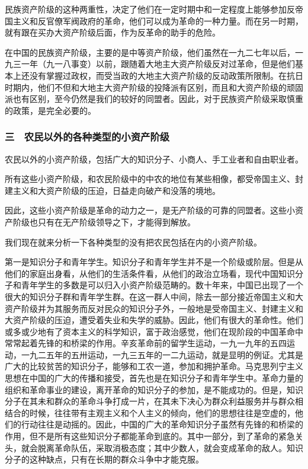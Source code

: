 民族资产阶级的这种两重性，决定了他们在一定时期中和一定程度上能够参加反帝国主义和反官僚军阀政府的革命，他们可以成为革命的一种力量。而在另一时期，就有跟在买办大资产阶级后面，作为反革命的助手的危险。

在中国的民族资产阶级，主要的是中等资产阶级，他们虽然在一九二七年以后，一九三一年（九一八事变）以前，跟随着大地主大资产阶级反对过革命，但是他们基本上还没有掌握过政权，而受当政的大地主大资产阶级的反动政策所限制。在抗日时期内，他们不但和大地主大资产阶级的投降派有区别，而且和大资产阶级的顽固派也有区别，至今仍然是我们的较好的同盟者。因此，对于民族资产阶级采取慎重的政策，是完全必要的。

\subsubsection{三　农民以外的各种类型的小资产阶级}

农民以外的小资产阶级，包括广大的知识分子、小商人、手工业者和自由职业者。

所有这些小资产阶级，和农民阶级中的中农的地位有某些相像，都受帝国主义、封建主义和大资产阶级的压迫，日益走向破产和没落的境地。

因此，这些小资产阶级是革命的动力之一，是无产阶级的可靠的同盟者。这些小资产阶级也只有在无产阶级领导之下，才能得到解放。

我们现在就来分析一下各种类型的没有把农民包括在内的小资产阶级。

第一是知识分子和青年学生。知识分子和青年学生并不是一个阶级或阶层。但是从他们的家庭出身看，从他们的生活条件看，从他们的政治立场看，现代中国知识分子和青年学生的多数是可以归入小资产阶级范畴的。数十年来，中国已出现了一个很大的知识分子群和青年学生群。在这一群人中间，除去一部分接近帝国主义和大资产阶级并为其服务而反对民众的知识分子外，一般地是受帝国主义、封建主义和大资产阶级的压迫，遭受着失业和失学的威胁。因此，他们有很大的革命性。他们或多或少地有了资本主义的科学知识，富于政治感觉，他们在现阶段的中国革命中常常起着先锋的和桥梁的作用。辛亥革命前的留学生运动，一九一九年的五四运动，一九二五年的五卅运动，一九三五年的一二九运动，就是显明的例证。尤其是广大的比较贫苦的知识分子，能够和工农一道，参加和拥护革命。马克思列宁主义思想在中国的广大的传播和接受，首先也是在知识分子和青年学生中。革命力量的组织和革命事业的建设，离开革命的知识分子的参加，是不能成功的。但是，知识分子在其未和群众的革命斗争打成一片，在其未下决心为群众利益服务并与群众相结合的时候，往往带有主观主义和个人主义的倾向，他们的思想往往是空虚的，他们的行动往往是动摇的。因此，中国的广大的革命知识分子虽然有先锋的和桥梁的作用，但不是所有这些知识分子都能革命到底的。其中一部分，到了革命的紧急关头，就会脱离革命队伍，采取消极态度；其中少数人，就会变成革命的敌人。知识分子的这种缺点，只有在长期的群众斗争中才能克服。

